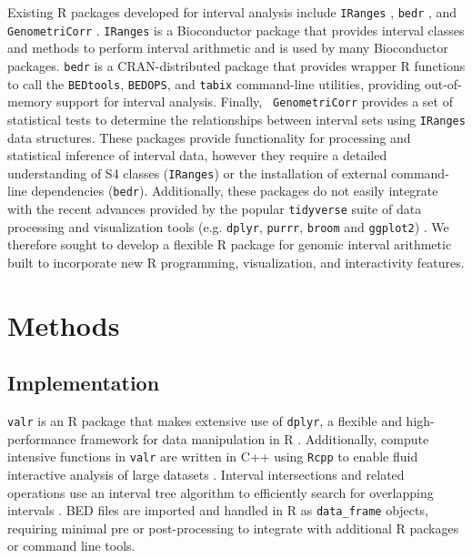 \documentclass[9pt,a4paper]{extarticle}
\begin{document}
	Existing R packages developed for interval analysis include \texttt{IRanges} \cite{lawrence_software_2013}, \texttt{bedr} \cite{haider_bedr_2016}, and \texttt{GenometriCorr} \cite{favorov_exploring_2012}. \texttt{IRanges} is a Bioconductor package that provides interval classes and methods to perform interval arithmetic and is used by many Bioconductor packages. \texttt{bedr} is a CRAN-distributed package that provides wrapper R functions to call the \texttt{BEDtools}, \texttt{BEDOPS}, and \texttt{tabix} command-line utilities, providing out-of-memory support for interval analysis. Finally, \texttt{ GenometriCorr} provides a set of statistical tests to determine the relationships between interval sets using \texttt{IRanges} data structures. These packages provide functionality for processing and statistical inference of interval data, however they require a detailed understanding of S4 classes (\texttt{IRanges}) or the installation of external command-line dependencies (\texttt{bedr}). Additionally, these packages do not easily integrate with the recent advances provided by the popular \texttt{tidyverse} suite of data processing and visualization tools (e.g. \texttt{dplyr}, \texttt{purrr}, \texttt{broom} and \texttt{ggplot2}) \cite{wickham_tidyverse_2017}. We therefore sought to develop a flexible R package for genomic interval arithmetic built to incorporate new R programming, visualization, and interactivity features.

\section*{Methods}

\subsection*{Implementation}
\texttt{valr} is an R package that makes extensive use of \texttt{dplyr}, a flexible and high-performance framework for data manipulation in R \cite{wickham_dplyr_2016}. Additionally, compute intensive functions in \texttt{valr} are written in C++ using \texttt{Rcpp} to enable fluid interactive analysis of large datasets \cite{eddelbuettel_rcpp_2011}. Interval intersections and related operations use an interval tree algorithm to efficiently search for overlapping intervals \cite{cormen_2001}. BED files are imported and handled in R as \texttt{data\_frame} objects, requiring minimal pre or post-processing to integrate with additional R packages or command line tools.
\end{document}
